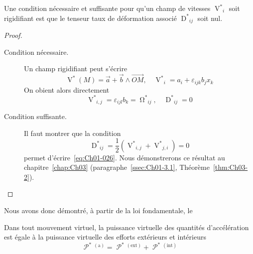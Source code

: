 \begin{lem}
    Une condition nécessaire et suffisante pour qu'un champ de vitesses $\displaystyle {\mathop{V}^{\ast}}_i$ soit rigidifiant est que le tenseur taux de déformation associé $\displaystyle {\mathop{D}^{\ast}}_{ij}$ soit nul.
    \label{lem:Ch01-3}
\end{lem}
\begin{proof}
    \begin{description}
        \item[Condition nécessaire.] Un champ rigidifiant peut s'écrire 
            \begin{equation}
                \mathop{V}^{\ast}(M) = \vec{a} + \vec{b} \wedge \vec{OM},\quad {\mathop{V}^{\ast}}_i = a_i + \varepsilon_{ijk} b_j x_k
                \label{eq:Ch01-026}
            \end{equation}
            On obient alors directement
            \begin{displaymath}
                {\mathop{V}^{\ast}}_{i,j} = \varepsilon_{ijl}b_k = {\mathop{\Omega}^{\ast}}_{ij},\quad {\mathop{D}^{\ast}}_{ij} = 0
            \end{displaymath}
        \item[Condition suffisante.] Il faut montrer que la condition
            \begin{equation}
                {\mathop{D}^{\ast}}_{ij} = \frac{1}{2} \left( {\mathop{V}^{\ast}}_{i,j} + {\mathop{V}^{\ast}}_{j,i} \right) = 0
                \label{eq:Ch01-027}
            \end{equation}
            permet d'écrire~\eqref{eq:Ch01-026}.
            Nous démonstrerons ce résultat au chapitre~\ref{chap:Ch03} (paragraphe~\ref{ssec:Ch01-3.1}, Théorème~\ref{thm:Ch03-2}).
    \end{description}
\end{proof}
Nous avons donc démontré, à partir de la loi fondamentale, le
\begin{thm}
    Dans tout mouvement virtuel, la puissance virtuelle des quantités d'accélération est égale à la puissance virtuelle des efforts extérieurs et intérieurs
    \begin{equation}
        \mathop{\mathcal{P}}^{\ast}{\!}^{(\text{a})} = \mathop{\mathcal{P}}^{\ast}{\!}^{(\text{ext})} + \mathop{\mathcal{P}}^{\ast}{\!}^{(\text{int})}
        \label{eq:Ch01-028}
    \end{equation}
\end{thm}


